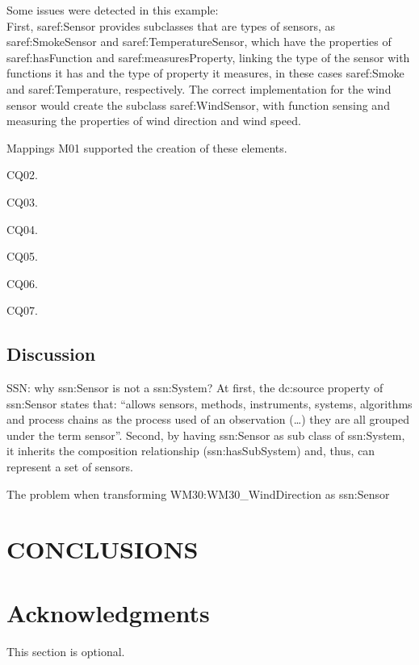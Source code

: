 \documentclass{sig-alternate-05-2015}
\begin{document}
Some issues were detected in this example:
\\First, saref:Sensor provides subclasses that are types of sensors, as saref:SmokeSensor and saref:TemperatureSensor, which have the properties of saref:hasFunction and saref:measuresProperty, linking the type of the sensor with functions it has and the type of property it measures, in these cases saref:Smoke and saref:Temperature, respectively. The correct implementation for the wind sensor would create the subclass saref:WindSensor, with function sensing and measuring the properties of wind direction and wind speed. 

Mappings M01 supported the creation of these elements.

CQ02.

CQ03.

CQ04.

CQ05.

CQ06.

CQ07. 

\subsection{Discussion}
SSN: why ssn:Sensor is not a ssn:System? At first, the dc:source property of ssn:Sensor states that: “allows sensors, methods, instruments, systems, algorithms and process chains as the process used of an observation (…) they are all grouped under the term sensor”. Second, by having ssn:Sensor as sub class of ssn:System, it inherits the composition relationship (ssn:hasSubSystem) and, thus, can represent a set of sensors.  

The problem when transforming WM30:WM30\_WindDirection as ssn:Sensor 

\section{CONCLUSIONS}

\section{Acknowledgments}
This section is optional.

%

%
%
\end{document}
